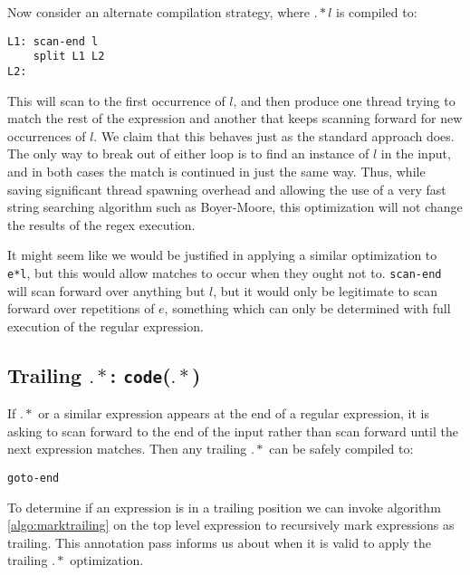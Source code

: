 Now consider an alternate compilation strategy, where $.*l$ is compiled
to:

\begin{verbatim}
L1: scan-end l
    split L1 L2
L2: 
\end{verbatim}

This will scan to the first occurrence of $l$, and then produce
one thread trying to match the rest of the expression and another that
keeps scanning forward for new occurrences of $l$. We claim that this
behaves just as the standard approach does. The only way to
break out of either loop is to find an instance of $l$ in the input,
and in both cases the match is continued in just the same way. Thus,
while saving significant thread spawning overhead and allowing the use
of a very fast string searching algorithm such as Boyer-Moore, this
optimization will not change the results of the regex execution.

It might seem like we would be justified in applying a similar 
optimization to \verb'e*l', but this would allow matches to occur
when they ought not to. \verb'scan-end' will scan forward over anything
but $l$, but it would only be legitimate to scan forward over repetitions
of $e$, something which can only be determined with full execution of
the regular expression.

\subsection{Trailing $.*$: {\tt code}($.*$) }

If $.*$ or a similar expression appears at the end of a regular expression,
it is asking to scan forward to the end of the input rather than scan
forward until the next expression matches. Then any trailing $.*$ can
be safely compiled to:

\begin{verbatim}
goto-end
\end{verbatim}

To determine if an expression is in a trailing position we can 
invoke algorithm \ref{algo:marktrailing} on the top level expression
to recursively mark expressions as trailing. This annotation pass
informs us about when it is valid to apply the trailing $.*$ optimization.

